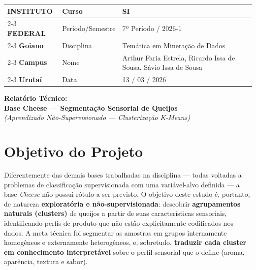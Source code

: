 \documentclass[11pt,a4paper]{article}
\begin{document}
\begin{table}[H]
\centering
\renewcommand{\arraystretch}{1.4}
\begin{tabular}{|m{3.0cm}|m{3.6cm}|m{6.6cm}|}
\hline
\centering\textbf{INSTITUTO} & Curso & SI \\ \cline{2-3}
\centering\textbf{FEDERAL} & Período/Semestre & 7º Período / 2026-1 \\ \cline{2-3}
\centering\textbf{Goiano} & Disciplina & Temática em Mineração de Dados \\ \cline{2-3}
\centering\textbf{Campus} & Nome & Arthur Faria Estrela, Ricardo Issa de Sousa, Sávio Issa de Sousa \\ \cline{2-3}
\centering\textbf{Urutaí} & Data & 13 / 03 / 2026 \\ \hline
\end{tabular}
\end{table}

\vspace{0.6cm}
\begin{center}
{\Large \textbf{Relatório Técnico:}}\\[0.3cm]
{\large \textbf{Base Cheese --- Segmentação Sensorial de Queijos}}\\[0.2cm]
{\normalsize \textit{(Aprendizado Não-Supervisionado --- Clusterização K-Means)}}
\end{center}
\vspace{0.4cm}

\section{Objetivo do Projeto}

Diferentemente das demais bases trabalhadas na disciplina --- todas voltadas a problemas de classificação supervisionada com uma variável-alvo definida --- a base \textit{Cheese} não possui rótulo a ser previsto. O objetivo deste estudo é, portanto, de natureza \textbf{exploratória e não-supervisionada}: descobrir \textbf{agrupamentos naturais (clusters)} de queijos a partir de suas características sensoriais, identificando perfis de produto que não estão explicitamente codificados nos dados. A meta técnica foi segmentar as amostras em grupos internamente homogêneos e externamente heterogêneos, e, sobretudo, \textbf{traduzir cada cluster em conhecimento interpretável} sobre o perfil sensorial que o define (aroma, aparência, textura e sabor).
\end{document}
